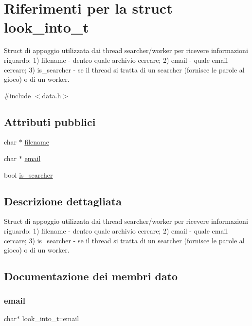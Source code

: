 \hypertarget{structlook__into__t}{}\section{Riferimenti per la struct look\+\_\+into\+\_\+t}
\label{structlook__into__t}


Struct di appoggio utilizzata dai thread searcher/worker per ricevere informazioni riguardo\+: 1) filename -\/ dentro quale archivio cercare; 2) email -\/ quale email cercare; 3) is\+\_\+searcher -\/ se il thread si tratta di un searcher (fornisce le parole al gioco) o di un worker.  




{\ttfamily \#include $<$data.\+h$>$}

\subsection*{Attributi pubblici}
\begin{DoxyCompactItemize}
\item 
char $\ast$ \hyperlink{structlook__into__t_aac2e0d99d8a29764003eb408fe9a0992}{filename}
\item 
char $\ast$ \hyperlink{structlook__into__t_a0e9aa8914a44800cef56c29c296d9ba1}{email}
\item 
bool \hyperlink{structlook__into__t_a4f74ba613ccae77bdec049edb078e8c0}{is\+\_\+searcher}
\end{DoxyCompactItemize}


\subsection{Descrizione dettagliata}
Struct di appoggio utilizzata dai thread searcher/worker per ricevere informazioni riguardo\+: 1) filename -\/ dentro quale archivio cercare; 2) email -\/ quale email cercare; 3) is\+\_\+searcher -\/ se il thread si tratta di un searcher (fornisce le parole al gioco) o di un worker. 

\subsection{Documentazione dei membri dato}
\mbox{\label{structlook__into__t_a0e9aa8914a44800cef56c29c296d9ba1}} 
\subsubsection{\texorpdfstring{email}{email}}
{\footnotesize\ttfamily char$\ast$ look\+\_\+into\+\_\+t\+::email}

